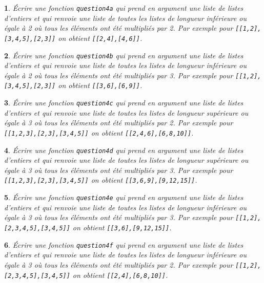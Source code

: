 \documentclass[10pt]{article}
\newtheorem{exi}{}
\newenvironment{exo}{\begin{exi}\em}{\end{exi}}
\begin{document}
\vspace*{-2ex}
\begin{exo}
    Écrire une fonction {\tt question4a} qui prend en argument une liste de listes d'entiers et qui renvoie une liste de toutes les listes
de longueur inférieure ou égale à 2 où tous les éléments ont été multipliés par 2. Par exemple pour \verb+[[1,2],[3,4,5],[2,3]]+ on obtient \verb+[[2,4],[4,6]]+.
\end{exo}
\vspace*{-2ex}
\begin{exo}
    Écrire une fonction {\tt question4b} qui prend en argument une liste de listes d'entiers et qui renvoie une liste de toutes les listes
de longueur inférieure ou égale à 2 où tous les éléments ont été multipliés par 3. Par exemple pour \verb+[[1,2],[3,4,5],[2,3]]+ on obtient \verb+[[3,6],[6,9]]+.
\end{exo}
\vspace*{-2ex}
\begin{exo}
    Écrire une fonction {\tt question4c} qui prend en argument une liste de listes d'entiers et qui renvoie une liste de toutes les listes
de longueur supérieure ou égale à 3 où tous les éléments ont été multipliés par 2. Par exemple pour \verb+[[1,2,3],[2,3],[3,4,5]]+ on obtient \verb+[[2,4,6],[6,8,10]]+.
\end{exo}
\vspace*{-2ex}
\begin{exo}
    Écrire une fonction {\tt question4d} qui prend en argument une liste de listes d'entiers et qui renvoie une liste de toutes les listes
de longueur supérieure ou égale à 3 où tous les éléments ont été multipliés par 3. Par exemple pour \verb+[[1,2,3],[2,3],[3,4,5]]+ on obtient \verb+[[3,6,9],[9,12,15]]+.
\end{exo}
\vspace*{-2ex}
\begin{exo}
    Écrire une fonction {\tt question4e} qui prend en argument une liste de listes d'entiers et qui renvoie une liste de toutes les listes
de longueur inférieure ou égale à 3 où tous les éléments ont été multipliés par 3. Par exemple pour \verb+[[1,2],[2,3,4,5],[3,4,5]]+ on obtient \verb+[[3,6],[9,12,15]]+.
\end{exo}
\vspace*{-2ex}
\begin{exo}
    Écrire une fonction {\tt question4f} qui prend en argument une liste de listes d'entiers et qui renvoie une liste de toutes les listes
de longueur inférieure ou égale à 3 où tous les éléments ont été multipliés par 2. Par exemple pour \verb+[[1,2],[2,3,4,5],[3,4,5]]+ on obtient \verb+[[2,4],[6,8,10]]+.
\end{exo}
\end{document}
